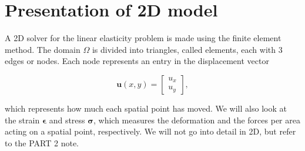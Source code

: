 \section{Presentation of 2D model}

A 2D solver for the linear elasticity problem is made using the finite element method. The domain $\Omega$ is divided into triangles, called elements, each with 3 edges or nodes. Each node represents an entry in the displacement vector

\begin{equation}
\bm{u}(x,y) = 
\begin{bmatrix}
u_x \\
u_y
\end{bmatrix},
\end{equation}

which represents how much each spatial point has moved. We will also look at the strain $\bm{\epsilon}$ and stress $\bm{\sigma}$, which measures the deformation and the forces per area acting on a spatial point, respectively. We will not go into detail in 2D, but refer to the PART 2 note.



